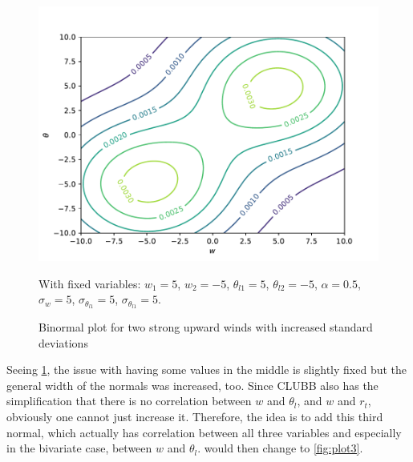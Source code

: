 \begin{figure}[!htb]
    \centering
    \includegraphics[width=.5\textwidth]{include/figures/plot2}
    \caption{Binormal plot for two strong upward winds with increased standard deviations}
    \label{fig:plot2}
    With fixed variables: $w_1 = 5$, $w_2 = -5$, $\theta_{l1} = 5$, $\theta_{l2} = -5$,
    $\alpha = 0.5$, $\sigma_w = 5$, $\sigma_{\theta_{l1}} = 5$, $\sigma_{\theta_{l1}} = 5$.
\end{figure}

Seeing \cref{fig:plot2},
the issue with having some values in the middle is slightly fixed
but the general width of the normals was increased, too.
Since \gls{CLUBB} also has the simplification that there is no correlation between $w$ and $\theta_l$,
and $w$ and $r_t$, obviously one cannot just increase it.
Therefore, the idea is to add this third normal,
which actually has correlation between all three variables
and especially in the bivariate case, between $w$ and $\theta_l$.
 would then change to \cref{fig:plot3}.

